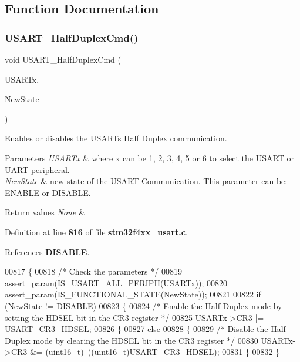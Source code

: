 \subsection{Function Documentation}
\mbox{\label{group__USART__Group5_gaaa23b05fe0e1896bad90da7f82750831}} 
\subsubsection{U\+S\+A\+R\+T\+\_\+\+Half\+Duplex\+Cmd()}
{\footnotesize\ttfamily void U\+S\+A\+R\+T\+\_\+\+Half\+Duplex\+Cmd (\begin{DoxyParamCaption}\item[{\textbf{ U\+S\+A\+R\+T\+\_\+\+Type\+Def} $\ast$}]{U\+S\+A\+R\+Tx,  }\item[{\textbf{ Functional\+State}}]{New\+State }\end{DoxyParamCaption})}



Enables or disables the U\+S\+A\+RT\textquotesingle{}s Half Duplex communication. 


\begin{DoxyParams}{Parameters}
{\em U\+S\+A\+R\+Tx} & where x can be 1, 2, 3, 4, 5 or 6 to select the U\+S\+A\+RT or U\+A\+RT peripheral. \\
\hline
{\em New\+State} & new state of the U\+S\+A\+RT Communication. This parameter can be\+: E\+N\+A\+B\+LE or D\+I\+S\+A\+B\+LE. \\
\hline
\end{DoxyParams}

\begin{DoxyRetVals}{Return values}
{\em None} & \\
\hline
\end{DoxyRetVals}


Definition at line \textbf{ 816} of file \textbf{ stm32f4xx\+\_\+usart.\+c}.



References \textbf{ D\+I\+S\+A\+B\+LE}.


\begin{DoxyCode}
00817 \{
00818   \textcolor{comment}{/* Check the parameters */}
00819   assert_param(IS_USART_ALL_PERIPH(USARTx));
00820   assert_param(IS_FUNCTIONAL_STATE(NewState));
00821   
00822   \textcolor{keywordflow}{if} (NewState != DISABLE)
00823   \{
00824     \textcolor{comment}{/* Enable the Half-Duplex mode by setting the HDSEL bit in the CR3 register */}
00825     USARTx->CR3 |= USART_CR3_HDSEL;
00826   \}
00827   \textcolor{keywordflow}{else}
00828   \{
00829     \textcolor{comment}{/* Disable the Half-Duplex mode by clearing the HDSEL bit in the CR3 register */}
00830     USARTx->CR3 &= (uint16\_t)~((uint16\_t)USART_CR3_HDSEL);
00831   \}
00832 \}
\end{DoxyCode}
